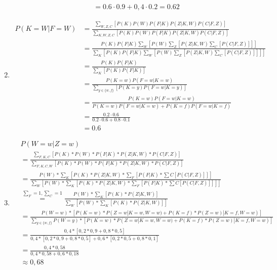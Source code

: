 \documentclass[a4paper,10pt]{article}
\begin{document}
\begin{enumerate}[~~a.)]
\begin{align*}
                &=0.6 \cdot 0.9 + 0,4 \cdot 0.2 = 0.62
            \end{align*}
        \item
            \begin{comment}
            \begin{align*}
            P(K=w|F=w)&=\frac{P(K=w,F=w)}{P(F=w)}\\
            &=\frac{P(K=w)\cdot P(F=w|K=w)}{\sum\limits_{k\in \{w,f\}}^{} P(F=w|K=k) \cdot P(K=k)}\\
            &=\frac{P(K=w)\cdot P(F=w|K=w)}{P(F=w|K=w)\cdot P(K=w)+P(F=w|K=f)\cdot P(K=f)}\\
            &=\frac{0,2 \cdot 0,6}{0,6\cdot 0,+0,1} \approx 0,1714
            \end{align*}
            \end{comment}
            \begin{align*}
                P(K=W|F=W) &=\frac{\sum_{W,Z,C} [P(K)P(W)P(F|K)P(Z|K,W)P(C|F,Z)]}{\sum_{K,W,Z,C} [P(K)P(W)P(F|K)P(Z|K,W)P(C|F,Z)]}\\
                &=\frac{P(K)P(F|K)\sum_W [P(W)\sum_Z [P(Z|K,W) \sum_C [P(C|F,Z)]]]}{\sum_K[P(K)P(F|K)\sum_W [P(W)\sum_Z [P(Z|K,W) \sum_C [P(C|F,Z)]]]]}\\
                &=\frac{P(K)P(F|K)}{\sum_K[P(K)P(F|K)]}\\
                &=\frac{P(K=w)P(F=w|K=w)}{\sum\limits_{y\in \{ w,f\}}^{} [P(K=y)P(F=w|K=y)]}\\
                &=\frac{P(K=w)P(F=w|K=w)}{P(K=w)P(F=w|K=w)+P(K=f)P(F=w|K=f)}\\
                &=\frac{0.2 \cdot 0.6}{0.2 \cdot 0.6 + 0.8 \cdot 0.1}\\
                &=0.6
            \end{align*}
        \item
        \begin{align*}
        	&P(W = w | Z = w) \\
        	&= \frac{\sum_{F,K,C} [P(K) * P(W) * P(F |K) *P(Z|K,W)*P(C|F,Z)]}{\sum_{F,K,C,W} [P(K) * P(W) * P(F |K) *P(Z|K,W)*P(C|F,Z)]}\\
        	&= \frac{P(W) *\sum_{K} [P(K) *P(Z|K,W) * \sum_{F}[P(F |K) * \sum{C}[P(C|F,Z)]]]}{\sum_{W}[P(W) *\sum_{K} [P(K) *P(Z|K,W) * \sum_{F}[P(F |K) * \sum{C}[P(C|F,Z)]]]]}\\
        	&\stackrel{\sum_{F}=1,\sum_{C}=1}= \frac{P(W) *\sum_{K} [P(K) *P(Z|K,W)]}{\sum_{W}[P(W) *\sum_{K} [P(K) *P(Z|K,W)]]}\\
        	&= \frac{P(W = w) * [P(K =w)* P(Z = w|K=w,W=w)+P(K=f)*P(Z=w)|K=f,W=w)]}{\sum_{y \in \{w, f\}}P(W = y) * [P(K =w)* P(Z = w|K=w,W=w)+P(K=f)*P(Z=w)|K=f,W=w)]} \\
        	&= \frac{0,4* [0,2*0,9+0,8*0,5]}{0,4* [0,2*0,9+0,8*0,5] + 0,6 * [0,2*0,5+0,8*0,1]} \\
        	&= \frac{0,4*0,58}{0,4*0,58+0,6*0,18} \\
        	&\approx 0,68
        \end{align*}
    \end{enumerate}
\end{document}
